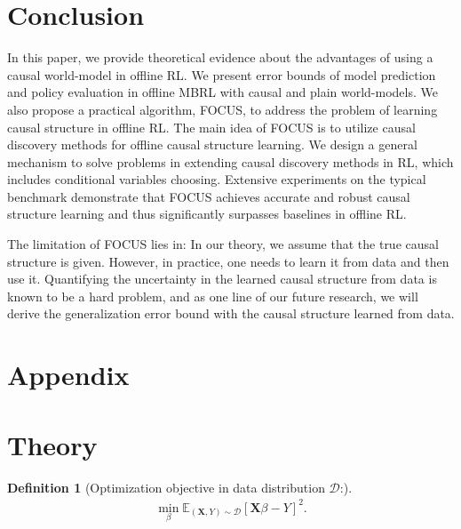 \documentclass{article}
\theoremstyle{plain}
\theoremstyle{definition}
\newtheorem{definition}[theorem]{Definition}
\theoremstyle{remark}
\begin{document}
\section{Conclusion}
In this paper, we provide theoretical evidence about the advantages of using a causal world-model in offline RL.
We present error bounds of model prediction and policy evaluation in offline MBRL with causal and plain world-models.
We also propose a practical algorithm, FOCUS, to address the problem of learning causal structure in offline RL.
The main idea of FOCUS is to utilize causal discovery methods for offline causal structure learning.
We design a general mechanism to solve problems in extending causal discovery methods in RL, which includes conditional variables choosing.
Extensive experiments on the typical benchmark demonstrate that FOCUS achieves accurate and robust causal structure learning and thus significantly surpasses baselines in offline RL.

The limitation of FOCUS lies in: In our theory, we assume that the true causal structure is given. 
However, in practice, one needs to learn it from data and then use it. 
Quantifying the uncertainty in the learned causal structure from data is known to be a hard problem, and as one line of our future research, we will derive the generalization error bound with the causal structure learned from data.




% 

% 



\newpage
\clearpage
\par
\newpage



\section*{Appendix}
\appendix
\section{Theory}
\label{app:theory}

\begin{definition}[Optimization objective in data distribution $\mathcal{D}$:]
\begin{align}
\min_{\beta} \mathbb{E}_{(\textbf{X},Y)\sim\mathcal{D}}[\textbf{X}\beta-Y]^2.
\end{align}
\end{definition}
\end{document}
